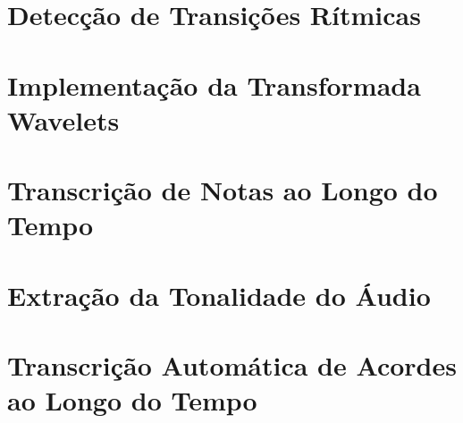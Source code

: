 \section{Detecção de Transições Rítmicas}

\section{Implementação da Transformada Wavelets}

\section{Transcrição de Notas ao Longo do Tempo}

\section{Extração da Tonalidade do Áudio}

\section{Transcrição Automática de Acordes ao Longo do Tempo}